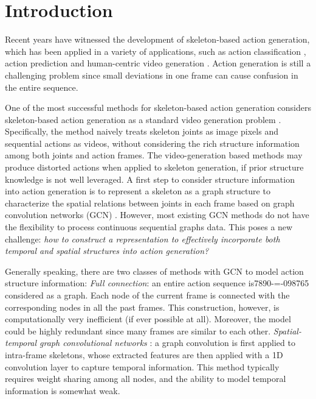 \documentclass[runningheads]{llncs}
\begin{document}
\section{Introduction}

Recent years have witnessed the development of skeleton-based action generation, which has been applied in a variety of applications, such as action classification \cite{hrnn2015,repactrec2017,interpre2017,shahroudy2016ntu,yan2018spatial}, action prediction \cite{hpgan2017,julieta2017motion,pred_eccv2018} and human-centric video generation \cite{wang2018vid2vid,yan2017skeleton}. Action generation is still a challenging problem since small deviations in one frame can cause confusion in the entire sequence.

One of the most successful methods for skeleton-based action generation considers skeleton-based action generation as a standard video generation problem
\cite{cai2018deep,habibie2017recurrent,wang2019learning}. Specifically, the method naively treats skeleton joints as image pixels and sequential actions as videos, without considering the rich structure information among both joints and action frames. 
The video-generation based methods may produce distorted actions when applied to skeleton generation, if prior structure knowledge is not well leveraged. A first step to consider structure information into action generation is to represent a skeleton as a graph structure to characterize the spatial relations between joints in each frame based on graph convolution networks (GCN) \cite{zhou2018graph,kipf2016semi,bruna2013spectral}. However, most existing GCN methods do not have the flexibility to process continuous sequential graphs data. 
This poses a new challenge: {\em how to construct a representation to effectively incorporate both temporal and spatial structures into action generation?}



Generally speaking, there are two classes of methods with GCN to model action structure information: 
 \textit{Full connection}: an entire action sequence is7890-=-098765 considered as a graph. Each node of the current frame is connected with the corresponding nodes in all the past frames. This construction, however, is computationally very inefficient (if ever possible at all). Moreover, the model could be highly redundant since many frames are similar to each other. 
 \textit{Spatial-temporal graph convolutional networks} \cite{yan2018spatial}:  a graph convolution is first applied to intra-frame skeletons, whose extracted features are then applied with a 1D convolution layer to capture temporal information. This method typically requires weight sharing among all nodes, and the ability to model temporal information is somewhat weak. 
\end{document}
